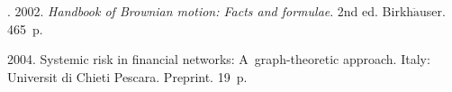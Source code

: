 \begin{multicols}{2}
{{\begin{thebibliography}{99}
 







. 2002.
\textit{Handbook of Brownian motion: Facts and formulae}.  2nd 
ed.  Birkh$\ddot{\mbox{a}}$user. 465~p.


 2004.
Systemic risk in financial networks: A~graph-theoretic approach. Italy: 
\mbox{Universit{\!}} di Chieti Pescara. Preprint.  19~p.


















\end{thebibliography}}}
\end{multicols}
